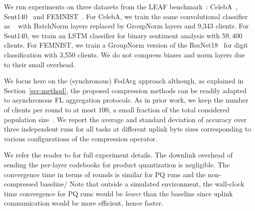 \documentclass[11pt]{article}
\newcommand{\sayan}[1]{{\color{red}Sayan: #1}}
\newcommand{\karthik}[1]{{\color{blue}Karthik: #1}}
\newcommand{\modif}[1]{{\color{black}#1}}
\begin{document}
 We run experiments on three datasets from the LEAF benchmark~\cite{Graham-caldas2018leaf}: CelebA~\cite{Graham-liu2015faceattributes}, Sent140~\cite{Graham-Go_Bhayani_Huang_2009} and FEMNIST~\cite{Graham-lecun2010mnist}. For CelebA, we train the same convolutional classifier as ~\cite{Graham-nguyen2021federated} with BatchNorm layers replaced by GroupNorm layers and 9,343 clients. For Sent140, we train an LSTM classifier for binary sentiment analysis with $59,400$ clients.
For FEMNIST, we train a GroupNorm version of the ResNet18~\cite{Graham-he2015deep} for digit classification with 3,550 clients.
We do not compress biases and norm layers due to their small overhead.

  We focus here on the (synchronous) FedAvg approach although, as explained in Section~\ref{sec:method}, the proposed compression methods can be readily adapted to asynchronous FL aggregation protocols. \modif{As in prior work, we keep the number of clients per round to at most $100$,
a small fraction of the total considered population size~\cite{Graham-chen2019federated,Graham-charles2021largecohort}.}
We report the average and standard deviation of accuracy over three independent runs for all tasks at different uplink byte sizes corresponding to various configurations of the compression operator.


 We refer the reader to \cite{Graham-techreport} for full experiment details.
The downlink overhead of sending the per-layer codebooks for product quantization is negligible.
The convergence time in terms of rounds is similar for PQ runs and the non-compressed baseline/
Note that outside a simulated environment, the wall-clock time convergence for PQ runs would be \emph{lower} than the baseline since uplink communication would be more efficient, hence faster.
\end{document}
